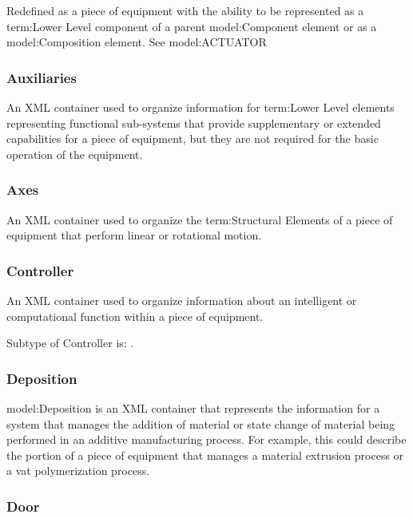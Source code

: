 Redefined as a piece of equipment with the ability to be represented as a {term:Lower Level} component of a parent {model:Component} element or as a {model:Composition} element. See {model:ACTUATOR}

\FloatBarrier

\subsubsection{Auxiliaries}
  \label{sec:Auxiliaries}


An XML container used to organize information for {term:Lower Level} elements representing functional sub-systems that provide supplementary or extended capabilities for a piece of equipment, but they are not required for the basic operation of the equipment.

\FloatBarrier

\subsubsection{Axes}
  \label{sec:Axes}


An XML container used to organize the {term:Structural Elements} of a piece of equipment that perform linear or rotational motion.

\FloatBarrier

\subsubsection{Controller}
  \label{sec:Controller}


An XML container used to organize information about an intelligent or computational function within a piece of equipment.


Subtype of Controller is: .
\FloatBarrier

\subsubsection{Deposition}
  \label{sec:Deposition}


{model:Deposition} is an XML container that represents the information for a system that manages the addition of material or state change of material being performed in an additive manufacturing process.  For example, this could describe the portion of a piece of equipment that manages a material extrusion process or a vat polymerization process.

\FloatBarrier

\subsubsection{Door}
  \label{sec:Door}


